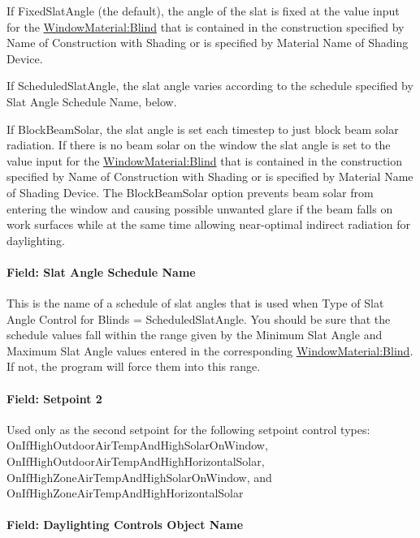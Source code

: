 If FixedSlatAngle (the default), the angle of the slat is fixed at the value input for the \hyperref[windowmaterialblind]{WindowMaterial:Blind} that is contained in the construction specified by Name of Construction with Shading or is specified by Material Name of Shading Device.

If ScheduledSlatAngle, the slat angle varies according to the schedule specified by Slat Angle Schedule Name, below.

If BlockBeamSolar, the slat angle is set each timestep to just block beam solar radiation. If there is no beam solar on the window the slat angle is set to the value input for the \hyperref[windowmaterialblind]{WindowMaterial:Blind} that is contained in the construction specified by Name of Construction with Shading or is specified by Material Name of Shading Device. The BlockBeamSolar option prevents beam solar from entering the window and causing possible unwanted glare if the beam falls on work surfaces while at the same time allowing near-optimal indirect radiation for daylighting.

\paragraph{Field: Slat Angle Schedule Name}\label{field-slat-angle-schedule-name}

This is the name of a schedule of slat angles that is used when Type of Slat Angle Control for Blinds = ScheduledSlatAngle. You should be sure that the schedule values fall within the range given by the Minimum Slat Angle and Maximum Slat Angle values entered in the corresponding \hyperref[windowmaterialblind]{WindowMaterial:Blind}. If not, the program will force them into this range.

\paragraph{Field: Setpoint 2}\label{field-setpoint-2}

Used only as the second setpoint for the following setpoint control types: OnIfHighOutdoorAirTempAndHighSolarOnWindow, OnIfHighOutdoorAirTempAndHighHorizontalSolar, OnIfHighZoneAirTempAndHighSolarOnWindow, and OnIfHighZoneAirTempAndHighHorizontalSolar

\paragraph{Field: Daylighting Controls Object Name}\label{field-daylighting-controls-object-name}

